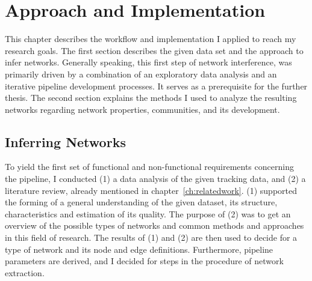 \chapter{Approach and Implementation}
\label{ch:approach}

This chapter describes the workflow and implementation I applied to reach my research goals.
The first section describes the given data set and the approach to infer networks.
Generally speaking, this first step of network interference, was primarily driven by a combination of an exploratory data analysis and an iterative pipeline development processes.
It serves as a prerequisite for the further thesis.
The second section explains the methods I used to analyze the resulting networks regarding network properties, communities, and its development.

\section{Inferring Networks}
\label{sec:infNetworks}

To yield the first set of functional and non-functional requirements concerning the pipeline, I conducted (1) a data analysis of the given tracking data, and (2) a literature review,  already mentioned in chapter~\ref{ch:relatedwork}.
(1) supported the forming of a general understanding of the given dataset, its structure, characteristics and estimation of its quality.
The purpose of (2) was to get an overview of the possible types of networks and common methods and approaches in this field of research.
The results of (1) and (2) are then used to decide for a type of network and its node and edge definitions.
Furthermore, pipeline parameters are derived, and I decided for steps in the procedure of network extraction.

